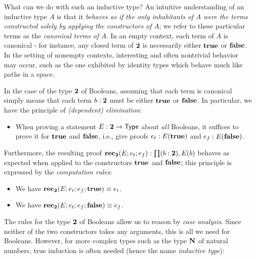 What can we do with such an inductive type? An intuitive understanding of an inductive type $A$ is that it \emph{behaves as if the only inhabitants of $A$ were the terms constructed solely by applying the constructors of $A$}; we refer to these particular terms as the \emph{canonical terms of $A$}. In an empty context,
each term of $A$ is canonical - for instance, any closed term of $\mathbf{2}$ is necessarily either $\mathbf{true}$ or $\mathbf{false}$. In the setting of nonempty contexts,  
interesting and often nontrivial behavior may occur, such as the one exhibited by identity types which behave much like paths in a space.

In the case of the type $\mathbf{2}$ of Booleans, assuming that each term is canonical simply means that each term $b : \mathbf{2}$ must be either $\mathbf{true}$ or $\mathbf{false}$. In particular, we have the principle of \emph{(dependent) elimination}:

\begin{itemize}
\item When proving a statement $E : \mathbf{2} \to \mathsf{Type}$ about \emph{all} Booleans, it suffices to prove it for $\mathbf{true}$ and $\mathbf{false}$, i.e., give proofs
$ e_t : E(\mathbf{true})$ and $e_f : E(\mathbf{false})$.
\end{itemize}

Furthermore, the resulting proof $\rec_\two(E;e_t;e_f): \prd{b : \two}E(b)$ behaves as expected when applied to the constructors $\mathbf{true}$ and $\mathbf{false}$; this principle is expressed by the \emph{computation rules}:
\begin{itemize}
\item We have $\mathbf{rec}_\mathbf{2}(E;e_t;e_f;\mathbf{true}) \equiv e_t$.
\item We have $\mathbf{rec}_\mathbf{2}(E;e_t;e_f;\mathbf{false}) \equiv e_f$.
\end{itemize}

The rules for the type $\mathbf{2}$ of Booleans allow us to reason by \emph{case analysis}. Since neither of the two constructors takes any arguments, this is all we need for Booleans. However, for more complex types such as the type $\mathbf{N}$ of natural numbers, true induction is often needed (hence the name \emph{inductive type}):

